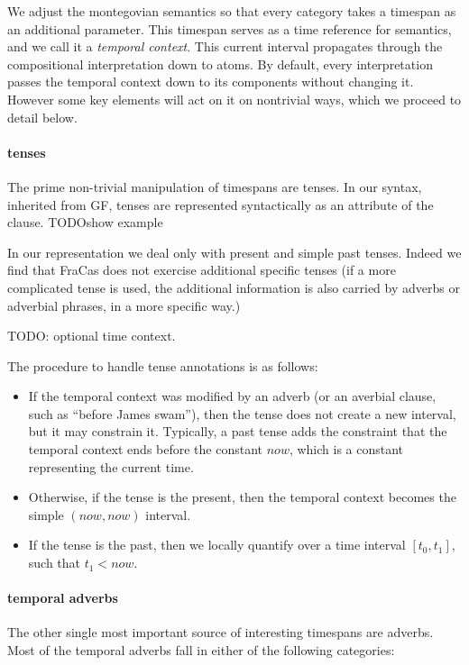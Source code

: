 \documentclass[a4paper,11pt]{article}
\begin{document}
We adjust the montegovian semantics so that every category takes a
timespan as an additional parameter. This timespan serves as a time
reference for semantics, and we call it a \emph{temporal context}. This current interval propagates through the compositional
interpretation down to atoms. By default, every interpretation passes
the temporal context down to its components without changing
it. However some key elements will act on it on nontrivial ways, which
we proceed to detail below.

\paragraph{tenses}

The prime non-trivial manipulation of timespans are tenses. In our
syntax, inherited from GF, tenses are represented syntactically as an
attribute of the clause. TODO{show example}

In our representation we deal only with present and simple past
tenses.  Indeed we find that FraCas does not exercise additional
specific tenses (if a more complicated tense is used, the additional
information is also carried by adverbs or adverbial phrases, in a more
specific way.)

TODO: optional time context.

The procedure to handle tense annotations is as follows:
\begin{itemize}
\item If the temporal context was modified by an adverb (or an
  averbial clause, such as ``before James swam''), then the tense does
  not create a new interval, but it may constrain it. Typically, a
  past tense adds the constraint that the temporal context ends before
  the constant $now$, which is a constant representing the current
  time.
\item Otherwise, if the tense is the present, then the temporal
  context becomes the simple $(now,now)$ interval.
\item
  If the tense is the past, then we locally quantify over a time
  interval $[t_0,t_1]$, such that $t_1 < now$.
\end{itemize}

\paragraph{temporal adverbs}

The other single most important source of interesting timespans are
adverbs. Most of the temporal adverbs fall in either of the following
categories:
\end{document}
